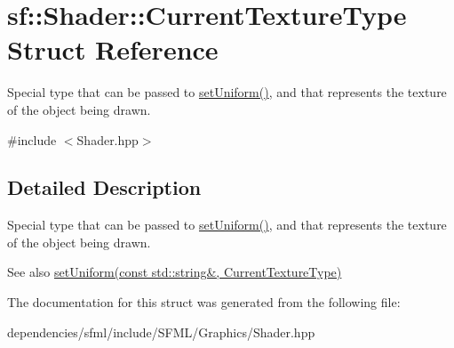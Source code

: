 \hypertarget{structsf_1_1_shader_1_1_current_texture_type}{}\section{sf\+:\+:Shader\+:\+:Current\+Texture\+Type Struct Reference}
\label{structsf_1_1_shader_1_1_current_texture_type}


Special type that can be passed to \hyperlink{classsf_1_1_shader_abf78e3bea1e9b0bab850b6b0a0de29c7}{set\+Uniform()}, and that represents the texture of the object being drawn.  




{\ttfamily \#include $<$Shader.\+hpp$>$}



\subsection{Detailed Description}
Special type that can be passed to \hyperlink{classsf_1_1_shader_abf78e3bea1e9b0bab850b6b0a0de29c7}{set\+Uniform()}, and that represents the texture of the object being drawn. 

\begin{DoxySeeAlso}{See also}
\hyperlink{classsf_1_1_shader_ab18f531e1f726b88fec1cf5a1e6af26d}{set\+Uniform(const std\+::string\&, Current\+Texture\+Type)} 
\end{DoxySeeAlso}


The documentation for this struct was generated from the following file\+:\begin{DoxyCompactItemize}
\item 
dependencies/sfml/include/\+S\+F\+M\+L/\+Graphics/Shader.\+hpp\end{DoxyCompactItemize}
